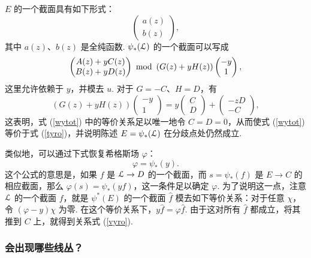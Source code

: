 $E$ 的一个截面具有如下形式：
\begin{equation}
\label{tyro}
\begin{pmatrix}a(z)\\
b(z)\end{pmatrix},
\end{equation}
其中 $a(z)$、$b(z)$ 是全纯函数. $\psi_*({\cal L})$ 的一个截面可以写成
\begin{equation}
\label{wytot}
\begin{pmatrix}A(z)+yC(z)\\ B(z)+yD(z)\end{pmatrix}~{\rm
mod}~ \left(G(z)+yH(z)\right)\begin{pmatrix}-y \\ 1\end{pmatrix},
\end{equation}
这里允许依赖于 $y$，并模去 $u$. 对于 $G=-C$、$H=D$，有
\begin{equation}
\label{qytot}
(G(z)+yH(z))\begin{pmatrix}-y \\
1\end{pmatrix} =y\begin{pmatrix}C \\ D\end{pmatrix}
+\begin{pmatrix}-zD\\ -C\end{pmatrix},
\end{equation}
这表明，式 (\ref{wytot}) 中的等价关系足以唯一地令 $C=D=0$，从而使式 (\ref{wytot}) 等价于式 (\ref{tyro})，并说明陈述 $E=\psi_*({\cal L})$ 在分歧点处仍然成立.

类似地，可以通过下式恢复希格斯场 $\varphi$：
\begin{equation}
\label{vyro} \varphi=\psi_*(y).
\end{equation}
这个公式的意思是，如果 $f$ 是 ${\cal L}\to D$ 的一个截面，而 $s=\psi_*(f)$ 是 $E\to C$ 的相应截面，那么 $\varphi(s)=\psi_*(yf)$，这一条件足以确定 $\varphi$. 为了说明这一点，注意 ${\cal L}$ 的一个截面 $f$，就是 $\psi^*(E)$ 的一个截面 $\hat f$ 模去如下等价关系：对于任意 $\chi$，令 $(\varphi-y)\chi$ 为零. 在这个等价关系下，$y\hat f=\varphi\hat f$. 由于这对所有 $\hat f$ 都成立，将其推到 $C$ 上，就得到关系式 (\ref{vyro}).

\subsubsection{会出现哪些线丛？}
\label{whichline}

